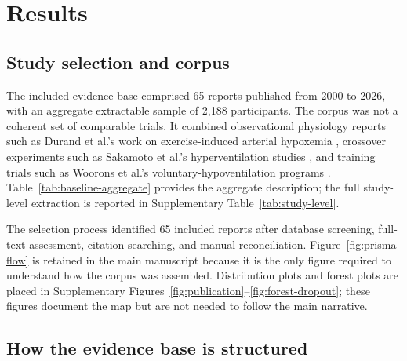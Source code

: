 \documentclass[12pt,a4paper]{article}
\begin{document}
\section{Results}
\subsection{Study selection and corpus}


The included evidence base comprised 65 reports published from 2000 to 2026, with an aggregate extractable sample of 2,188 participants. The corpus was not a coherent set of comparable trials. It combined observational physiology reports such as Durand et al.'s work on exercise-induced arterial hypoxemia \parencite{durand_f_and_mucci_p_and_prefaut_c_evidence_2000}, crossover experiments such as Sakamoto et al.'s hyperventilation studies \parencite{sakamoto_a_and_naito_h_and_chow_cm_hyperventilation_2014,sakamoto_a_and_naito_h_and_chow_cm_hyperventilation-induced_2015,sakamoto_a_and_naito_h_and_chow_cm_effects_2018,sakamoto_hyperventilation-aided_2020}, and training trials such as Woorons et al.'s voluntary-hypoventilation programs \parencite{woorons_effects_2008,woorons_hypoventilation_2016,woorons_physiological_2019,woorons_transferable_2020,woorons_x_and_faucher_c_and_dufour_sp_and_brocherie_f_and_robach_p_and_connes_p_and_brugniaux_jv_and_verges_s_and_gaston_af_and_millet_g_and_dupuy_o_and_pichon_a_hypoventilation_2024}. Table~\ref{tab:baseline-aggregate} provides the aggregate description; the full study-level extraction is reported in Supplementary Table~\ref{tab:study-level}.



The selection process identified 65 included reports after database screening, full-text assessment, citation searching, and manual reconciliation. Figure~\ref{fig:prisma-flow} is retained in the main manuscript because it is the only figure required to understand how the corpus was assembled. Distribution plots and forest plots are placed in Supplementary Figures~\ref{fig:publication}--\ref{fig:forest-dropout}; these figures document the map but are not needed to follow the main narrative.

\subsection{How the evidence base is structured}

\end{document}
